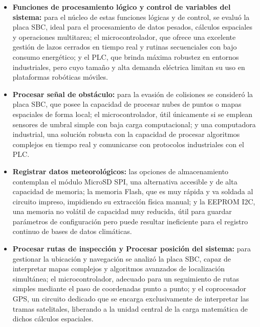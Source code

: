 \begin{itemize}
	\item \textbf{Funciones de procesamiento lógico y control de variables del sistema:} para el núcleo de estas funciones lógicas y de control, se evaluó la placa SBC, ideal para el procesamiento de datos pesados, cálculos espaciales y operaciones multitarea; el microcontrolador, que ofrece una excelente gestión de lazos cerrados en tiempo real y rutinas secuenciales con bajo consumo energético; y el PLC, que brinda máxima robustez en entornos industriales, pero cuyo tamaño y alta demanda eléctrica limitan su uso en plataformas robóticas móviles.
	
	\item \textbf{Procesar señal de obstáculo:} para la evasión de colisiones se consideró la placa SBC, que posee la capacidad de procesar nubes de puntos o mapas espaciales de forma local; el microcontrolador, útil únicamente si se emplean sensores de umbral simple con baja carga computacional; y una computadora industrial, una solución robusta con la capacidad de procesar algoritmos complejos en tiempo real y comunicarse con protocolos industriales con el PLC.
	
	\item \textbf{Registrar datos meteorológicos:} las opciones de almacenamiento contemplan el módulo MicroSD SPI, una alternativa accesible y de alta capacidad de memoria; la memoria Flash, que es muy rápida y va soldada al circuito impreso, impidiendo su extracción física manual; y la EEPROM I2C, una memoria no volátil de capacidad muy reducida, útil para guardar parámetros de configuración pero puede resultar ineficiente para el registro continuo de bases de datos climáticas.
	
	\item \textbf{Procesar rutas de inspección y Procesar posición del sistema:} para gestionar la ubicación y navegación se analizó la placa SBC, capaz de interpretar mapas complejos y algoritmos avanzados de localización simultánea; el microcontrolador, adecuado para un seguimiento de rutas simples mediante el paso de coordenadas punto a punto; y el coprocesador GPS, un circuito dedicado que se encarga exclusivamente de interpretar las tramas satelitales, liberando a la unidad central de la carga matemática de dichos cálculos espaciales.
\end{itemize}
